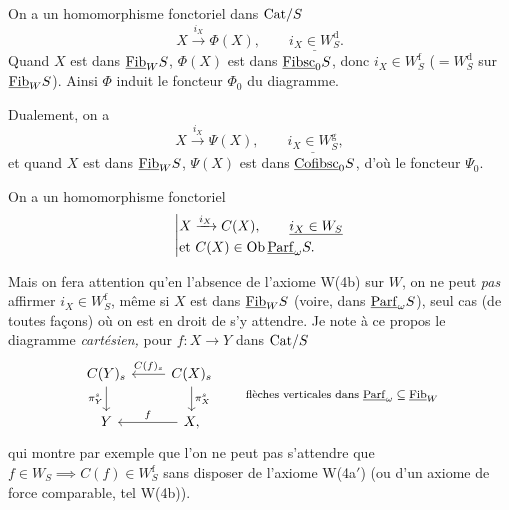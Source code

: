  On a un homomorphisme fonctoriel dans $\mathrm{Cat}/S$
\[
X \xrightarrow{i_X} \Phi(X), \qquad \underline{i_X \in W^{\mathrm{d}}_S}.
\]
Quand $X$ est dans $\underline{\mathrm{Fib}}_W S$, $\Phi(X)$ est dans $\underline{\mathrm{Fibsc}}_0 S$, donc $i_X \in W^{\mathrm{f}}_S$ ($= W^{\mathrm{d}}_S$ sur $\underline{\mathrm{Fib}}_W S$). Ainsi $\Phi$ induit le foncteur $\Phi_0$ du diagramme.

Dualement, on a
\[
X \xrightarrow{i_X} \Psi(X), \qquad \underline{i_X \in W^{\mathrm{g}}_S},
\]
et quand $X$ est dans $\underline{\mathrm{Fib}}_W S$, $\Psi(X)$ est dans $\underline{\mathrm{Cofibsc}}_0 S$, d’où le foncteur $\Psi_0$.

 On a un homomorphisme fonctoriel
\[
\left|
\begin{aligned}
& X \xrightarrow{i_X} C(X), \qquad \underline{i_X \in W_S} \\
& \text{et } C(X) \in \mathrm{Ob}\,\underline{\mathrm{Parf}}_\omega S.
\end{aligned}
\right.
\]

\troisbarres Mais on fera attention qu’en l’absence de l’axiome W(4b) sur $W$, on ne peut \textit{pas} affirmer $i_X \in W^{\mathrm{f}}_S$, même si $X$ est dans $\underline{\mathrm{Fib}}_W S$ (voire, dans $\underline{\mathrm{Parf}}_\omega S$), seul cas (de toutes façons) où on est en droit de s’y attendre. Je note à ce propos le diagramme \textit{cartésien,} pour $f : X \longrightarrow Y$ dans $\mathrm{Cat}/S$
\[
\begin{tikzcd}
C(Y)_s \arrow[d, "\pi^{s}_{Y}"'] & C(X)_s \arrow[l, "C(f)_s"'] \arrow[d, "\pi^{s}_{X}"] \\
Y & X, \arrow[l, "f"']
\end{tikzcd}
\qquad \text{\footnotesize flèches verticales dans $\Parf_\omega \subseteq \Fib_W$}
\]
qui montre par exemple que
l’on ne peut pas s’attendre que $f \in W_S \implies C(f) \in W^{\mathrm{f}}_S$ sans disposer de l’axiome W(4a$'$) (ou d’un axiome de force comparable, tel W(4b)).

